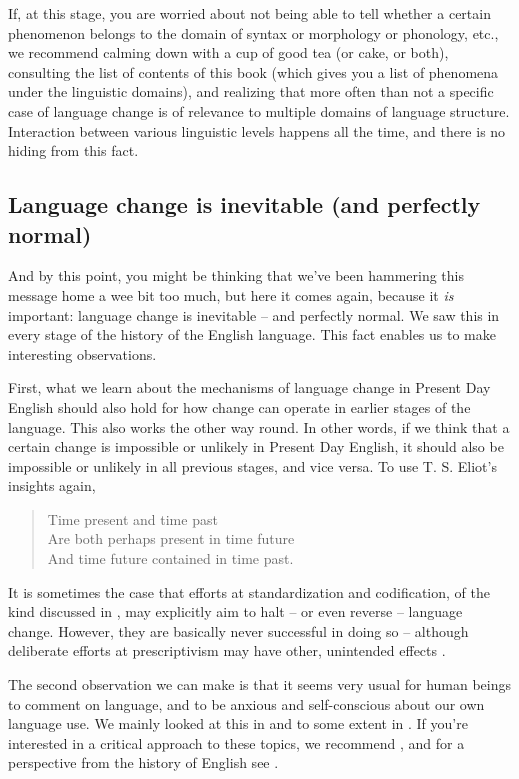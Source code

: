 If, at this stage, you are worried about not being able to tell whether a certain phenomenon belongs to the domain of syntax or morphology or phonology, etc., we recommend calming down with a cup of good tea (or cake, or both), consulting the list of contents of this book (which gives you a list of phenomena under the linguistic domains), and realizing that more often than not a specific case of language change is of relevance to multiple domains of language structure. Interaction between various linguistic levels happens all the time, and there is no hiding from this fact.

\subsection{Language change is inevitable (and perfectly normal)}
And by this point, you might be thinking that we've been hammering this message home a wee bit too much, but here it comes again, because it \textit{is} important: language change is inevitable -- and perfectly normal. We saw this in every stage of the history of the English language. This fact enables us to make interesting observations.

First, what we learn about the mechanisms of language change in Present Day English should also hold for how change can operate in earlier stages of the language. This also works the other way round. In other words, if we think that a certain change is impossible or unlikely in Present Day English, it should also be impossible or unlikely in all previous stages, and vice versa. To use T. S. Eliot's insights again,

\begin{quote}
    Time present and time past\\
    Are both perhaps present in time future\\
    And time future contained in time past.\\
    \citep[171]{Eliot}
\end{quote}

\noindent It is sometimes the case that efforts at standardization and codification, of the kind discussed in , may explicitly aim to halt -- or even reverse -- language change. However, they are basically never successful in doing so -- although deliberate efforts at prescriptivism may have other, unintended effects \citep{Curzan2014}.

The second observation we can make is that it seems very usual for human beings to comment on language, and to be anxious and self-conscious about our own language use. We mainly looked at this in  and to some extent in . If you're interested in a critical approach to these topics, we recommend \citet{Cameron2003}, and for a perspective from the history of English see \citet{Machan2009}.\\

